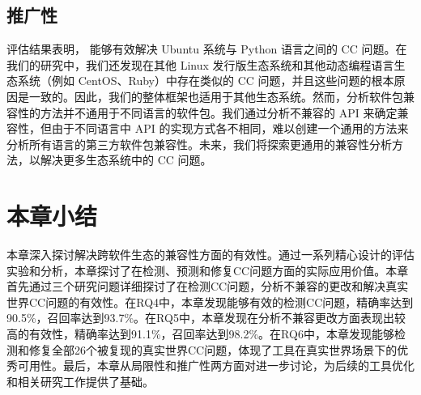 \subsection{推广性}
评估结果表明，\tool{} 能够有效解决 Ubuntu 系统与 Python 语言之间的 CC 问题。在我们的研究中，我们还发现在其他 Linux 发行版生态系统和其他动态编程语言生态系统（例如 CentOS、Ruby）中存在类似的 CC 问题，并且这些问题的根本原因是一致的。因此，我们的整体框架也适用于其他生态系统。然而，分析软件包兼容性的方法并不通用于不同语言的软件包。我们通过分析不兼容的 API 来确定兼容性，但由于不同语言中 API 的实现方式各不相同，难以创建一个通用的方法来分析所有语言的第三方软件包兼容性。未来，我们将探索更通用的兼容性分析方法，以解决更多生态系统中的 CC 问题。

\section{本章小结}
本章深入探讨\tool{}解决跨软件生态的兼容性方面的有效性。通过一系列精心设计的评估实验和分析，本章探讨了\tool{}在检测、预测和修复CC问题方面的实际应用价值。本章首先通过三个研究问题详细探讨了\tool{}在检测CC问题，分析不兼容的更改和解决真实世界CC问题的有效性。在RQ4中，本章发现\tool{}能够有效的检测CC问题，精确率达到90.5\%，召回率达到93.7\%。在RQ5中，本章发现\tool{}在分析不兼容更改方面表现出较高的有效性，精确率达到91.1\%，召回率达到98.2\%。在RQ6中，本章发现\tool{}能够检测和修复全部26个被复现的真实世界CC问题，体现了工具在真实世界场景下的优秀可用性。最后，本章从局限性和推广性两方面对\tool{}进一步讨论，为后续的工具优化和相关研究工作提供了基础。